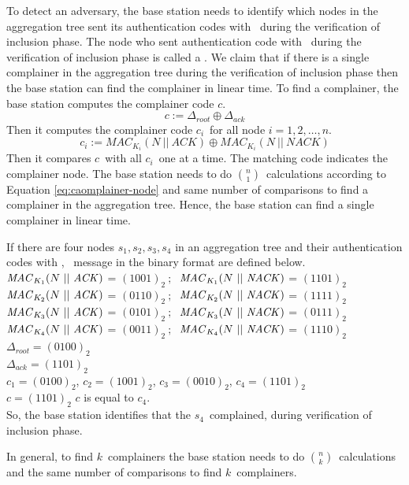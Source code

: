 		To detect an adversary, the base station needs to identify which nodes in the aggregation tree sent its authentication codes with \nack\ during the verification of inclusion phase.
		The node who sent authentication code with \nack\ during the verification of inclusion phase is called a \complainer. 
		We claim that if there is a single complainer in the aggregation tree during the verification of inclusion phase then the base station can find the complainer in linear time.
		To find a complainer, the base station computes the complainer code $c$.
		\begin{equation}\label{eq:complainer}
			c := \Delta_{root} \oplus \Delta_{ack}
		\end{equation}
		Then it computes the complainer code $c_{i}$\ for all node $i = 1, 2, \dotsc, n$. 
		\begin{equation}\label{eq:caomplainer-node}
			c_{i} := MAC_{K_{i}}(N\ ||\ \textit{ACK}) \oplus MAC_{K_{i}}(N\ ||\ \textit{NACK})
		\end{equation}
		Then it compares $c$\ with all $c_{i}$\ one at a time. 
		The matching code indicates the complainer node.
		The base station needs to do $n \choose 1$\ calculations according to Equation \ref{eq:caomplainer-node} and same number of comparisons to find a complainer in the aggregation tree. 
		Hence, the base station can find a single complainer in linear time.
		\begin{exmp} If there are four nodes ${s_{1},s_{2},s_{3},s_{4}}$ in an aggregation tree and their authentication codes with \ack, \nack\ message in the binary format are defined below.\\
			$\mac_{K_{1}}(N\ ||\ \ack)$ = $(1001)_{2}\ ;\ $
			$\mac_{K_{1}}(N\ ||\ \nack)$ = $(1101)_{2}$\\
			$\mac_{K_{2}}(N\ ||\ \ack)$ = $(0110)_{2}\ ;\ $
			$\mac_{K_{2}}(N\ ||\ \nack)$ = $(1111)_{2}$\\	
			$\mac_{K_{3}}(N\ ||\ \ack)$ = $(0101)_{2}\ ;\ $
			$\mac_{K_{3}}(N\ ||\ \nack)$ = $(0111)_{2}$\\
			$\mac_{K_{4}}(N\ ||\ \ack)$ = $(0011)_{2}\ ;\ $
			$\mac_{K_{4}}(N\ ||\ \nack)$ = $(1110)_{2}$\\
			$\Delta_{root} = (0100)_{2}$\\
			$\Delta_{ack} = (1101)_{2}$\\
			$c_{1} = (0100)_{2}$, $c_{2} = (1001)_{2}$, $c_{3} = (0010)_{2}$, $c_{4} = (1101)_{2}$\ \\
			$c = (1101)_{2}$
			$c$ is equal to $c_{4}.$\\
			So, the base station identifies that the $s_{4}$\ complained, during verification of inclusion phase.\\ 
		\end{exmp}
		In general, to find $k$\ complainers the base station needs to do $ n \choose k$\ calculations and the same number of comparisons to find $k$\ complainers.
		
